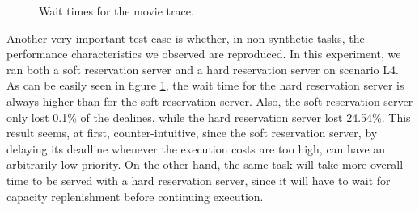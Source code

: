 \documentclass[times, 10pt,twocolumn]{article}
\begin{document}
\begin{figure}[t]
  \centering
  \caption{Wait times for the movie trace.}
  \label{fig:eve}
\end{figure}

Another very important test case is whether, in non-synthetic tasks,
the performance characteristics we observed are reproduced. In this
experiment, we ran both a soft reservation server and a hard
reservation server on scenario L4. As can be easily seen in figure
\ref{fig:eve}, the wait time for the hard reservation server is always
higher than for the soft reservation server. Also, the soft
reservation server only lost 0.1\% of the dealines, while the hard
reservation server lost 24.54\%. This result seems, at first,
counter-intuitive, since the soft reservation server, by delaying its
deadline whenever the execution costs are too high, can have an
arbitrarily low priority. On the other hand, the same task will take
more overall time to be served with a hard reservation server, since
it will have to wait for capacity replenishment before continuing
execution.
\end{document}
